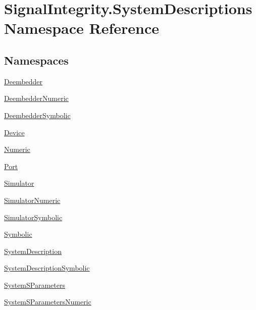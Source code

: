 \hypertarget{namespaceSignalIntegrity_1_1SystemDescriptions}{}\section{Signal\+Integrity.\+System\+Descriptions Namespace Reference}
\label{namespaceSignalIntegrity_1_1SystemDescriptions}
\subsection*{Namespaces}
\begin{DoxyCompactItemize}
\item 
 \hyperlink{namespaceSignalIntegrity_1_1SystemDescriptions_1_1Deembedder}{Deembedder}
\item 
 \hyperlink{namespaceSignalIntegrity_1_1SystemDescriptions_1_1DeembedderNumeric}{Deembedder\+Numeric}
\item 
 \hyperlink{namespaceSignalIntegrity_1_1SystemDescriptions_1_1DeembedderSymbolic}{Deembedder\+Symbolic}
\item 
 \hyperlink{namespaceSignalIntegrity_1_1SystemDescriptions_1_1Device}{Device}
\item 
 \hyperlink{namespaceSignalIntegrity_1_1SystemDescriptions_1_1Numeric}{Numeric}
\item 
 \hyperlink{namespaceSignalIntegrity_1_1SystemDescriptions_1_1Port}{Port}
\item 
 \hyperlink{namespaceSignalIntegrity_1_1SystemDescriptions_1_1Simulator}{Simulator}
\item 
 \hyperlink{namespaceSignalIntegrity_1_1SystemDescriptions_1_1SimulatorNumeric}{Simulator\+Numeric}
\item 
 \hyperlink{namespaceSignalIntegrity_1_1SystemDescriptions_1_1SimulatorSymbolic}{Simulator\+Symbolic}
\item 
 \hyperlink{namespaceSignalIntegrity_1_1SystemDescriptions_1_1Symbolic}{Symbolic}
\item 
 \hyperlink{namespaceSignalIntegrity_1_1SystemDescriptions_1_1SystemDescription}{System\+Description}
\item 
 \hyperlink{namespaceSignalIntegrity_1_1SystemDescriptions_1_1SystemDescriptionSymbolic}{System\+Description\+Symbolic}
\item 
 \hyperlink{namespaceSignalIntegrity_1_1SystemDescriptions_1_1SystemSParameters}{System\+S\+Parameters}
\item 
 \hyperlink{namespaceSignalIntegrity_1_1SystemDescriptions_1_1SystemSParametersNumeric}{System\+S\+Parameters\+Numeric}

\end{DoxyCompactItemize}
